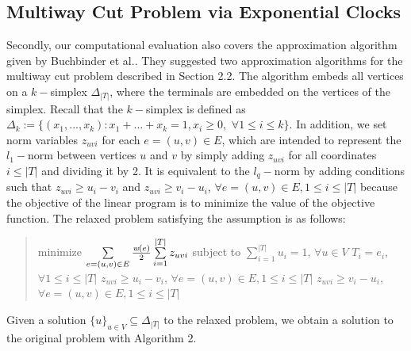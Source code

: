 \documentclass[a4paper]{article}
\begin{document}
\subsection{Multiway Cut Problem via Exponential Clocks}
%
Secondly, our computational evaluation also covers the approximation algorithm given by Buchbinder et al.\cite{buchbinder2013simplex}. They suggested two approximation algorithms for the multiway cut problem described in Section 2.2.
\newline \indent
The algorithm embeds all vertices on a $k-$simplex $\Delta_{|T|}$, where the terminals are embedded on the vertices of the simplex. Recall that the $k-$simplex is defined as $\Delta_{k}:=\{(x_{1},...,x_{k}):x_{1}+\dots +x_{k}=1, x_{i}\ge 0,$ $\forall 1\le i\le k\}$. In addition, we set norm variables $z_{uvi}$ for each $e=(u,v)\in E$, which are intended to represent the $l_{1}-$norm between vertices $u$ and $v$ by simply adding $z_{uvi}$ for all coordinates $i\le |T|$ and dividing it by 2. It is equivalent to the $l_{q}-$norm by adding conditions such that $z_{uvi}\ge u_{i} - v_{i}$ and $z_{uvi}\ge v_{i} - u_{i}$, $\forall e=(u,v)\in E, 1\le i\le |T|$ because the objective of the linear program is to minimize the value of the objective function. The relaxed problem satisfying the assumption is as follows: 
\begin{quotation}
\noindent
minimize $\sum\limits_{e=(u,v)\in E} {\textit{w}(e)\over 2} \sum\limits_{i=1}^{|T|}z_{uvi}$
\newline
subject to $\sum\limits_{i=1}^{|T|} u_{i} = 1$, $\forall u\in V$
\newline
\indent \indent \indent $T_{i}=\textit{e}_{i}$, $\forall 1\le i\le |T|$
\newline
\indent \indent \indent $z_{uvi}\ge u_{i} - v_{i}$, $\forall e=(u,v)\in E, 1\le i\le |T|$
\newline
\indent \indent \indent $z_{uvi}\ge v_{i} - u_{i}$, $\forall e=(u,v)\in E, 1\le i\le |T|$
\end{quotation}
\indent \indent
Given a solution $\{u\}_{u\in V}\subseteq \Delta_{|T|}$ to the relaxed problem, we obtain a solution to the original problem with Algorithm 2.
\end{document}
